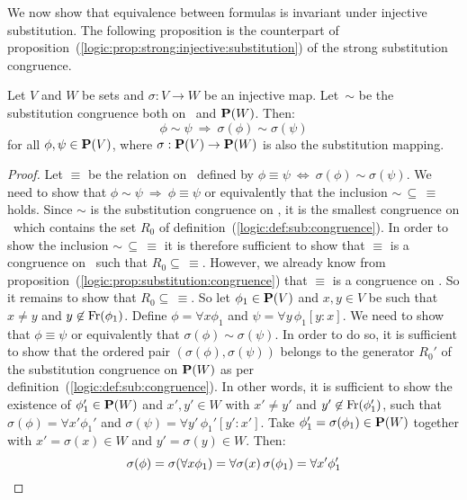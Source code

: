 We now show that equivalence between formulas is invariant under
injective substitution. The following proposition is the counterpart
of proposition~(\ref{logic:prop:strong:injective:substitution}) of
the strong substitution congruence.

\begin{prop}\label{logic:prop:sub:congruence:injective:substitution}
Let $V$ and $W$ be sets and $\sigma:V\to W$ be an injective map.
Let~$\sim$ be the substitution congruence both on \pv\ and ${\bf
P}(W)$. Then:
    \[
    \phi\sim\psi\ \Rightarrow\ \sigma(\phi)\sim\sigma(\psi)
    \]
for all $\phi,\psi\in\mbox{${\bf P}(V)$}$, where $\sigma:\mbox{${\bf P}(V)$}\to{\bf P}(W)$ is also
the substitution mapping.
\end{prop}
\begin{proof}
Let $\equiv$ be the relation on \pv\ defined by $\phi\equiv\psi\
\Leftrightarrow\ \sigma(\phi)\sim\sigma(\psi)$. We need to show that
$\phi\sim\psi\ \Rightarrow\ \phi\equiv\psi$ or equivalently that the
inclusion $\sim\,\subseteq\,\equiv$ holds. Since $\sim$ is the
substitution congruence on \pv, it is the smallest congruence on
\pv\ which contains the set $R_{0}$ of
definition~(\ref{logic:def:sub:congruence}). In order to show the
inclusion $\sim\,\subseteq\,\equiv$ it is therefore sufficient to
show that $\equiv$ is a congruence on \pv\ such that
$R_{0}\subseteq\,\equiv$. However, we already know from
proposition~(\ref{logic:prop:substitution:congruence}) that $\equiv$
is a congruence on \pv. So it remains to show that
$R_{0}\subseteq\,\equiv$. So let $\phi_{1}\in\mbox{${\bf P}(V)$}$ and $x,y\in V$ be
such that $x\neq y$ and $y\not\in\mbox{\rm Fr}(\phi_{1})$. Define
$\phi=\forall x\phi_{1}$ and $\psi=\forall y\,\phi_{1}[y\!:\!x]$. We
need to show that $\phi\equiv\psi$ or equivalently that
$\sigma(\phi)\sim\sigma(\psi)$. In order to do so, it is sufficient
to show that the ordered pair $(\sigma(\phi),\sigma(\psi))$ belongs
to the generator $R_{0}'$ of the substitution congruence on ${\bf
P}(W)$ as per definition~(\ref{logic:def:sub:congruence}). In other
words, it is sufficient to show the existence of $\phi_{1}'\in{\bf
P}(W)$ and $x',y'\in W$ with $x'\neq y'$ and
$y'\not\in\mbox{\rm Fr}(\phi_{1}')$, such that $\sigma(\phi)=\forall
x'\phi_{1}'$ and $\sigma(\psi)=\forall y'\,\phi_{1}'[y'\!:\!x']$.
Take $\phi_{1}'=\sigma(\phi_{1})\in{\bf P}(W)$ together with
$x'=\sigma(x)\in W$ and $y'=\sigma(y)\in W$. Then:
    \[
    \sigma(\phi)=\sigma(\forall x\phi_{1})\\
        =\forall\sigma(x)\,\sigma(\phi_{1})\\
        =\forall x'\phi_{1}'
\]
\end{proof}
